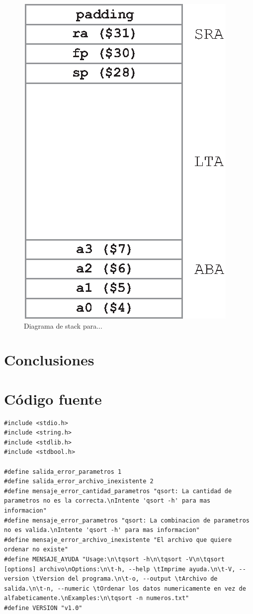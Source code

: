 \documentclass[a4paper, 12pt]{article}
\begin{document}
	\begin{figure}[H]
		\centering
		\includegraphics[scale=1]{files/stack_frame.eps}
		\caption{Diagrama de stack para...}
		\label{fig:diag:stack}
	\end{figure}
	\section{Conclusiones}
	
	\newpage
	\section{Código fuente}
	
	\begin{lstlisting}
#include <stdio.h>
#include <string.h>
#include <stdlib.h>
#include <stdbool.h>

#define salida_error_parametros 1
#define salida_error_archivo_inexistente 2
#define mensaje_error_cantidad_parametros "qsort: La cantidad de parametros no es la correcta.\nIntente 'qsort -h' para mas informacion"
#define mensaje_error_parametros "qsort: La combinacion de parametros no es valida.\nIntente 'qsort -h' para mas informacion"
#define mensaje_error_archivo_inexistente "El archivo que quiere ordenar no existe"
#define MENSAJE_AYUDA "Usage:\n\tqsort -h\n\tqsort -V\n\tqsort [options] archivo\nOptions:\n\t-h, --help \tImprime ayuda.\n\t-V, --version \tVersion del programa.\n\t-o, --output \tArchivo de salida.\n\t-n, --numeric \tOrdenar los datos numericamente en vez de alfabeticamente.\nExamples:\n\tqsort -n numeros.txt"
#define VERSION "v1.0"
	\end{lstlisting}
	
\end{document}
